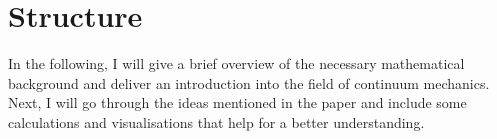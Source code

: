 \section{Structure}
In the following, I will give a brief overview of the necessary mathematical background and deliver an introduction into the field of continuum mechanics. Next, I will go through the ideas mentioned in the paper and include some calculations and visualisations that help for a better understanding. \\


